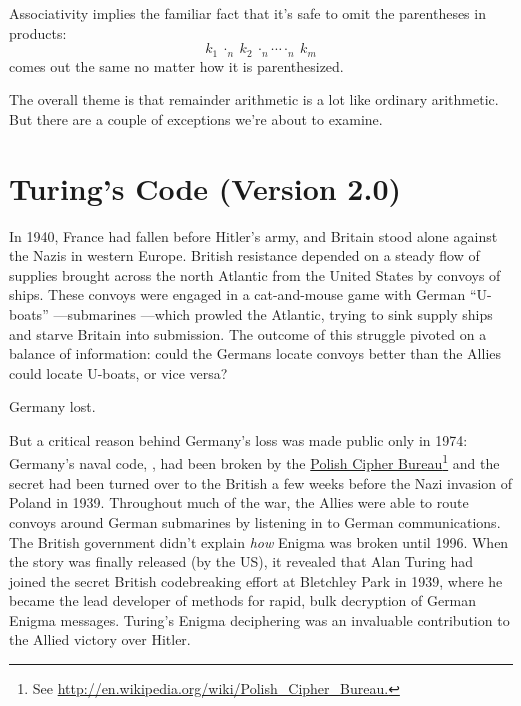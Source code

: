 Associativity implies the familiar fact that it's safe to omit the
parentheses in products:
\[
k_1\ \cdot_n\ k_2\ \cdot_n \cdots \cdot_n\ k_m
\]
comes out the same no matter how it is parenthesized.

The overall theme is that remainder arithmetic is a lot like ordinary
arithmetic.  But there are a couple of exceptions we're about to
examine.

\begin{problems}
\practiceproblems
{}

\homeworkproblems
{}

\classproblems
{}

\examproblems

\end{problems}

\section{Turing's Code (Version 2.0)}

In 1940, France had fallen before Hitler's army, and Britain stood
alone against the Nazis in western Europe.  British resistance
depended on a steady flow of supplies brought across the north
Atlantic from the United States by convoys of ships.  These convoys
were engaged in a cat-and-mouse game with German ``U-boats''
---submarines ---which prowled the Atlantic, trying to sink supply
ships and starve Britain into submission.  The outcome of this
struggle pivoted on a balance of information: could the Germans locate
convoys better than the Allies could locate U-boats, or vice versa?

Germany lost.

But a critical reason behind Germany's loss was made public only in
1974: Germany's naval code, , had been broken by the
\href{http://en.wikipedia.org/wiki/Polish_Cipher_Bureau}{Polish Cipher
  Bureau}\footnote{See
  \href{http://en.wikipedia.org/wiki/Polish_Cipher_Bureau}
       {http://en.wikipedia.org/wiki/Polish\_Cipher\_Bureau.}}  and
the secret had been turned over to the British a few weeks before the
Nazi invasion of Poland in 1939.  Throughout much of the war, the
Allies were able to route convoys around German submarines by
listening in to German communications.  The British government didn't
explain \emph{how} Enigma was broken until 1996.  When the story was
finally released (by the US), it revealed that Alan Turing had joined
the secret British codebreaking effort at Bletchley Park in 1939,
where he became the lead developer of methods for rapid, bulk
decryption of German Enigma messages.  Turing's Enigma deciphering was
an invaluable contribution to the Allied victory over Hitler.

